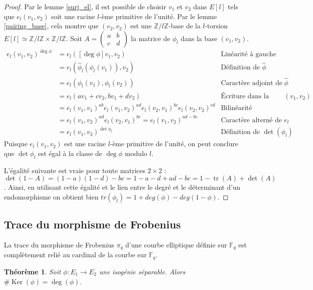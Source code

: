 \documentclass{article}
\theoremstyle{plain}%
\newtheorem{thm}{Théorème}[section]
\theoremstyle{definition}%
\newcommand{\F}{\mathbb{F}}
\newcommand{\Z}{\mathbb{Z}}
\newcommand{\h}{\widehat}
\DeclareMathOperator{\tr}{tr}
\DeclareMathOperator{\Ker}{Ker}
\begin{document}
\begin{proof}
  Par le lemme \ref{surj_el}, il est possible de choisir $v_1$ et $v_2$ dans $E[l]$ tels que $e_l(v_1, v_2)$ soit une racine $l$-ème primitive de l'unité. Par le lemme \ref{pairing_base}, cela montre que $(v_2, v_2)$ est une $\Z/l\Z$-base de la $l$-torsion $E[l] \simeq \Z/l\Z\times\Z/l\Z$. 
  Soit $A = \begin{pmatrix} a & b \\ c & d \end{pmatrix}$ la matrice de $\phi_l$ dans la base $(v_1, v_2)$.
  \begin{align*}
  e_l(v_1, v_2)^{\deg\phi} 
  &= e_l([\deg\phi]v_1, v_2) & \text{Linéarité à gauche} \\
  &= e_l(\h\phi_l(\phi_l(v_1)), v_2) & \text{Définition de $\h\phi$} \\
  &= e_l(\phi_l(v_1), \phi_l(v_2)) & \text{Caractère adjoint de $\h\phi$} \\
  &= e_l(av_1+cv_2, bv_1+dv_2) & \text{Écriture dans la base $(v_1, v_2)$} \\
  &= e_l(v_1, v_1)^{ab} e_l(v_1, v_2)^{ad} e_l(v_2, v_1)^{bc} e_l(v_2, v_2)^{cd} & \text{Bilinéarité} \\
  &= e_l(v_1, v_2)^{ad} e_l(v_2, v_1)^{bc} = e_l(v_1, v_2)^{ad-bc} & \text{Caractère alterné de $e_l$} \\
  &= e_l(v_1, v_2)^{\det\phi_l} & \text{Définition de $\det(\phi_l)$}
  \end{align*}
  Puisque $e_l(v_1, v_2)$ est une racine $l$-ème primitive de l'unité, on peut conclure que $\det\phi_l$ est égal à la classe de $\deg\phi$ modulo $l$.

   L'égalité suivante est vraie pour toute matrices $2\times 2$ : $\det(1-A) = (1-a)(1-d) - bc = 1 -a -d + ad -bc = 1 - \tr(A) + \det(A)$. Ainsi, en utilisant cette égalité et le lien entre le degré et le déterminant d'un endomorphisme on obtient bien $tr(\phi_l) = 1 + deg(\phi) - deg(1-\phi)$.   
\end{proof}

\subsection{Trace du morphisme de Frobenius}

La trace du morphisme de Frobenius $\pi_q$ d'une courbe elliptique définie sur $\F_q$ est complètement relié au cardinal de la courbe sur $\F_q$.

\begin{thm}
  \label{cardinal_noyau}
  Soit $\phi:E_1\to E_2$ une isogénie séparable. Alors $\# \Ker(\phi) = \deg(\phi)$.  
\end{thm}
\end{document}
